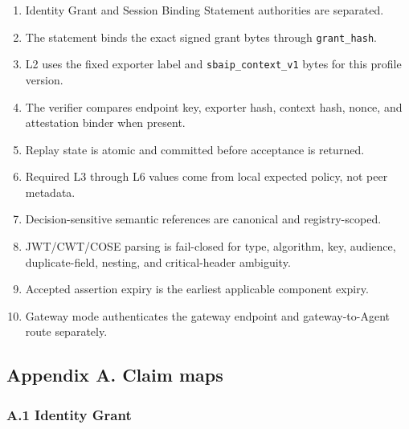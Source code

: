 \documentclass[
]{article}
\providecommand{\tightlist}{%
  \setlength{\itemsep}{0pt}\setlength{\parskip}{0pt}}
\begin{document}
\begin{enumerate}
\def\labelenumi{\arabic{enumi}.}
\tightlist
\item
  Identity Grant and Session Binding Statement authorities are
  separated.
\item
  The statement binds the exact signed grant bytes through
  \texttt{grant\_hash}.
\item
  L2 uses the fixed exporter label and \texttt{sbaip\_context\_v1} bytes
  for this profile version.
\item
  The verifier compares endpoint key, exporter hash, context hash,
  nonce, and attestation binder when present.
\item
  Replay state is atomic and committed before acceptance is returned.
\item
  Required L3 through L6 values come from local expected policy, not
  peer metadata.
\item
  Decision-sensitive semantic references are canonical and
  registry-scoped.
\item
  JWT/CWT/COSE parsing is fail-closed for type, algorithm, key,
  audience, duplicate-field, nesting, and critical-header ambiguity.
\item
  Accepted assertion expiry is the earliest applicable component expiry.
\item
  Gateway mode authenticates the gateway endpoint and gateway-to-Agent
  route separately.
\end{enumerate}

\subsection{Appendix A. Claim maps}\label{appendix-a.-claim-maps}

\subsubsection{A.1 Identity Grant}\label{a.1-identity-grant}
\end{document}
